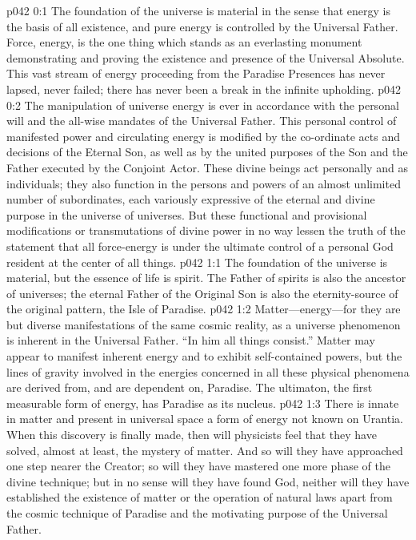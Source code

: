 \author{Mighty Messenger}
\vs p042 0:1 The foundation of the universe is material in the sense that energy is the basis of all existence, and pure energy is controlled by the Universal Father. Force, energy, is the one thing which stands as an everlasting monument demonstrating and proving the existence and presence of the Universal Absolute. This vast stream of energy proceeding from the Paradise Presences has never lapsed, never failed; there has never been a break in the infinite upholding.
\vs p042 0:2 The manipulation of universe energy is ever in accordance with the personal will and the all\hyp{}wise mandates of the Universal Father. This personal control of manifested power and circulating energy is modified by the co\hyp{}ordinate acts and decisions of the Eternal Son, as well as by the united purposes of the Son and the Father executed by the Conjoint Actor. These divine beings act personally and as individuals; they also function in the persons and powers of an almost unlimited number of subordinates, each variously expressive of the eternal and divine purpose in the universe of universes. But these functional and provisional modifications or transmutations of divine power in no way lessen the truth of the statement that all force\hyp{}energy is under the ultimate control of a personal God resident at the center of all things.
\vs p042 1:1 The foundation of the universe is material, but the essence of life is spirit. The Father of spirits is also the ancestor of universes; the eternal Father of the Original Son is also the eternity\hyp{}source of the original pattern, the Isle of Paradise.
\vs p042 1:2 Matter---energy---for they are but diverse manifestations of the same cosmic reality, as a universe phenomenon is inherent in the Universal Father. “In him all things consist.” Matter may appear to manifest inherent energy and to exhibit self\hyp{}contained powers, but the lines of gravity involved in the energies concerned in all these physical phenomena are derived from, and are dependent on, Paradise. The ultimaton, the first measurable form of energy, has Paradise as its nucleus.
\pc \vs p042 1:3 There is innate in matter and present in universal space a form of energy not known on Urantia. When this discovery is finally made, then will physicists feel that they have solved, almost at least, the mystery of matter. And so will they have approached one step nearer the Creator; so will they have mastered one more phase of the divine technique; but in no sense will they have found God, neither will they have established the existence of matter or the operation of natural laws apart from the cosmic technique of Paradise and the motivating purpose of the Universal Father.
